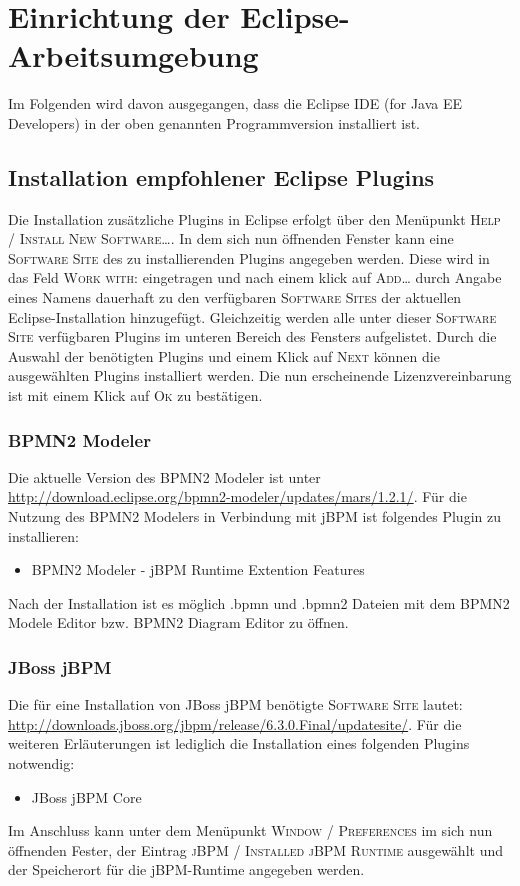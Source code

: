\section{Einrichtung der Eclipse-Arbeitsumgebung}
Im Folgenden wird davon ausgegangen, dass die Eclipse IDE (for Java EE Developers) in der oben genannten Programmversion installiert ist.

\subsection{Installation empfohlener Eclipse Plugins}
Die Installation zusätzliche Plugins in Eclipse erfolgt über den Menüpunkt \textsc{Help / Install New Software\ldots}. In dem sich nun öffnenden Fenster kann eine \textsc{Software Site} des zu installierenden Plugins angegeben werden. Diese wird in das Feld \textsc{Work with:} eingetragen und nach einem klick auf \textsc{Add\ldots} durch Angabe eines Namens dauerhaft zu den verfügbaren \textsc{Software Sites} der aktuellen Eclipse-Installation hinzugefügt. Gleichzeitig werden alle unter dieser \textsc{Software Site} verfügbaren Plugins im unteren Bereich des Fensters aufgelistet. Durch die Auswahl der benötigten Plugins und einem Klick auf \textsc{Next} können die ausgewählten Plugins installiert werden. Die nun erscheinende Lizenzvereinbarung ist mit einem Klick auf \textsc{Ok} zu bestätigen.

\subsubsection{BPMN2 Modeler}
Die aktuelle Version des BPMN2 Modeler ist unter \url{http://download.eclipse.org/bpmn2-modeler/updates/mars/1.2.1/}. Für die Nutzung des BPMN2 Modelers in Verbindung mit jBPM ist folgendes Plugin zu installieren:
\begin{itemize}\renewcommand{\labelitemi}{\itemizecheck}
	\item BPMN2 Modeler - jBPM Runtime Extention Features
\end{itemize}
Nach der Installation ist es möglich {\ttfamily.bpmn} und {\ttfamily.bpmn2} Dateien mit dem BPMN2 Modele Editor bzw. BPMN2 Diagram Editor zu öffnen.

\subsubsection{JBoss jBPM}
Die für eine Installation von JBoss jBPM benötigte \textsc{Software Site} lautet: \url{http://downloads.jboss.org/jbpm/release/6.3.0.Final/updatesite/}. Für die weiteren Erläuterungen ist lediglich die Installation eines folgenden Plugins notwendig:
\begin{itemize}\renewcommand{\labelitemi}{\itemizecheck}
	\item JBoss jBPM Core
\end{itemize}
Im Anschluss kann unter dem Menüpunkt \textsc{Window / Preferences} im sich nun öffnenden Fester, der Eintrag \textsc{jBPM / Installed jBPM Runtime} ausgewählt und der Speicherort für die jBPM-Runtime angegeben werden.

